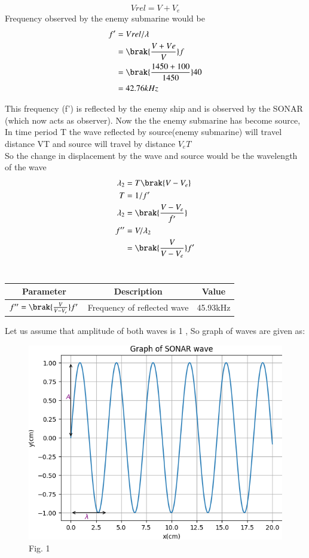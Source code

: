 \documentclass[journal,12pt,onecolumn]{IEEEtran}
\theoremstyle{remark}
\begin{document}
\begin{equation}
Vrel=V+V_e
\end{equation}
Frequency observed by the enemy submarine would be
\begin{align}
f'&=Vrel/\lambda\\
&=\brak{\frac{V+Ve}{V}}f\\
&= \brak{\frac{1450+100}{1450}}40\\
&=42.76kHz
\end{align}

This frequency (f') is reflected by the enemy ship and is observed by the SONAR (which now acts as observer).
Now the the enemy submarine has become source,\\
In time period T the wave reflected by source(enemy submarine) will travel distance VT and source will travel by distance $V_eT$\\
So the change in displacement by the wave and source would be the wavelength of the wave
\begin{align}
\lambda_2&=T\brak{V-V_e}\\
T&=1/f'\\
\lambda_2&=\brak{\frac{V-V_e}{f'}}\\
f''&=V/\lambda_2\\
&=\brak{\frac{V}{V-V_e}}f'
\end{align}
\\
\begin{tabular}{|c|c|c|}
   \hline
   Parameter & Description & Value\\
   \hline
   $f''= \brak{\frac{V}{V-V_e}}f'$& Frequency of reflected wave & 45.93kHz\\
   \hline
   
\end{tabular}
\newpage
Let us assume that amplitude of both waves is 1 , So graph of waves are given as: 

\begin{figure}[h]
   
    \includegraphics[width=120mm]{figs/fig1.png}\\
     \centering
    {Fig. 1}
  
\end{figure}
\end{document}
